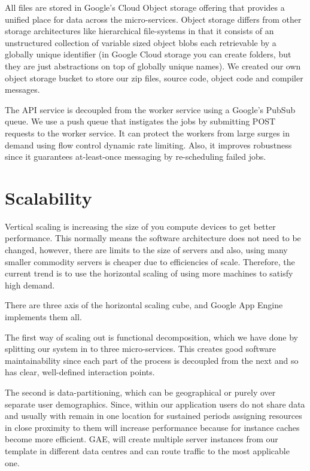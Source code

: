 \documentclass[conference]{IEEEtran}
\begin{document}
All files are stored in Google's Cloud Object storage offering that provides a unified place for data across the micro-services. Object storage differs from other storage architectures like hierarchical file-systems in that it consists of an unstructured collection of variable sized object blobs each retrievable by a globally unique identifier (in Google Cloud storage you can create folders, but they are just abstractions on top of globally unique names). We created our own object storage bucket to store our zip files, source code, object code and compiler messages. 

The API service is decoupled from the worker service using a Google's PubSub queue. We use a push queue that instigates the jobs by submitting POST requests to the worker service. It can protect the workers from large surges in demand using flow control dynamic rate limiting. Also, it improves robustness since it guarantees at-least-once messaging by re-scheduling failed jobs.

\section{Scalability}

Vertical scaling is increasing the size of you compute devices to get better performance. This normally means the software architecture does not need to be changed, however, there are limits to the size of servers and also, using many smaller commodity servers is cheaper due to efficiencies of scale. Therefore, the current trend is to use the horizontal scaling of using more machines to satisfy high demand.

There are three axis of the horizontal scaling cube, and Google App Engine
implements them all.

The first way of scaling out is functional decomposition, which we have done by splitting our system in to three micro-services. This creates good software maintainability since each part of the process is decoupled from the next and so has clear, well-defined interaction points.

The second is data-partitioning, which can be geographical or purely over separate user demographics. Since, within our application users do not share data and usually with remain in one location for sustained periods assigning resources in close proximity to them will increase performance because for instance caches become more efficient. GAE, will create multiple server instances from our template in different data centres and can route traffic to the most applicable one. 
\end{document}

